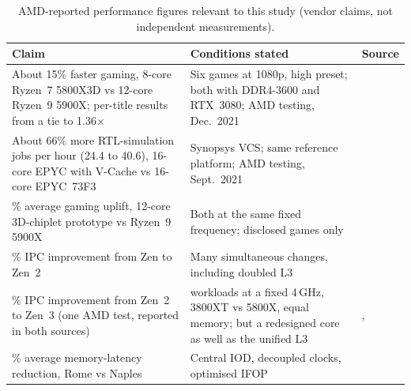 \begin{table}[htbp]
  \centering
  \caption[AMD-reported performance figures relevant to this study]{AMD-reported performance figures relevant to this study (vendor claims, not independent measurements).}
  \label{tab:amd-reported}
  \small
  \begin{tabularx}{\textwidth}{@{}>{\raggedright\arraybackslash}X>{\raggedright\arraybackslash}p{4.4cm}>{\raggedright\arraybackslash}p{2.0cm}@{}}
    \toprule
    \textbf{Claim} & \textbf{Conditions stated} & \textbf{Source} \\
    \midrule
    About 15\% faster gaming, 8-core Ryzen~7 5800X3D vs 12-core Ryzen~9 5900X; per-title results from a tie to 1.36$\times$ & Six games at 1080p, high preset; both with DDR4-3600 and RTX~3080; AMD testing, Dec.\ 2021 & \cite[slides~29, 35]{wuu2022vcache} \\
    About 66\% more RTL-simulation jobs per hour (24.4 to 40.6), 16-core EPYC with V-Cache vs 16-core EPYC~73F3 & Synopsys VCS; same reference platform; AMD testing, Sept.\ 2021 & \cite[slides~31, 35]{wuu2022vcache} \\
    15\% average gaming uplift, 12-core 3D-chiplet prototype vs Ryzen~9 5900X & Both at the same fixed frequency; disclosed games only & \cite{swaminathanAdvancedPackagingEnabling2021} \\
    15\% IPC improvement from Zen to Zen~2 & Many simultaneous changes, including doubled L3 & \cite{suggs2019zen2} \\
    19\% IPC improvement from Zen~2 to Zen~3 (one AMD test, reported in both sources) & 25 workloads at a fixed 4\,GHz, 3800XT vs 5800X, equal memory; but a redesigned core as well as the unified L3 & \cite{advancedmicrodevicesinc.AMDLaunchesAMD2020}, \cite[slides~10, 35]{wuu2022vcache} \\
    19\% average memory-latency reduction, Rome vs Naples & Central IOD, decoupled clocks, optimised IFOP & \cite{naffziger2020chiplet} \\
    \bottomrule
  \end{tabularx}
\end{table}

